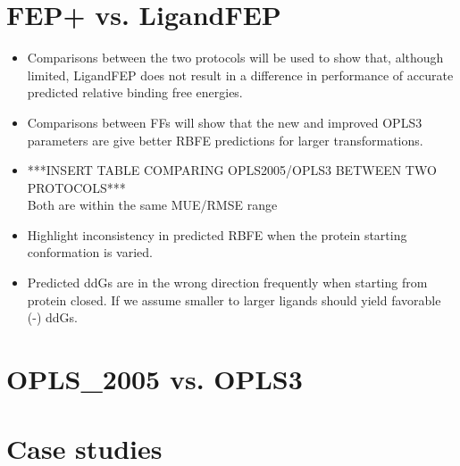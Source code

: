 \documentclass[journal=jctcce,manuscript=article]{achemso}
\begin{document}
\begin{suppinfo}
\section{FEP+ vs. LigandFEP}
   \begin{itemize}
   \item Comparisons between the two protocols will be used to show that, although limited, LigandFEP does not result in a difference in performance of accurate predicted relative binding free energies.
   \item Comparisons between FFs will show that the new and improved OPLS3 parameters are give better RBFE predictions for larger transformations.
   \item ***INSERT TABLE COMPARING OPLS2005/OPLS3 BETWEEN TWO PROTOCOLS***
      \\ Both are within the same MUE/RMSE range
   \item Highlight inconsistency in predicted RBFE when the protein starting conformation is varied.
   \item Predicted ddGs are in the wrong direction frequently when starting from protein closed.
      If we assume smaller to larger ligands should yield favorable (-) ddGs.
   \end{itemize}

\section{OPLS_2005 vs. OPLS3}

\section{Case studies}

\end{suppinfo}
\end{document}
